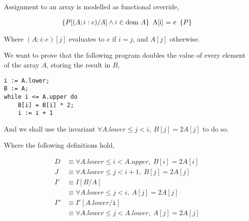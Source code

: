 \begin{definition}
  Assignment to an array is modelled as functional override,

  \begin{align*}
    \htriple{P[(A; i : e)/A] \land i \in \dom~A}{A[i] = e}{P}
  \end{align*}

  Where $(A; i : e)[j]$ evaluates to $e$ if $i = j$, and $A[j]$
  otherwise.
\end{definition}

\begin{example}
  \label{exmpl:heap-double}

  We want to prove that the following program doubles the value of
  every element of the array $A$, storing the result in $B$,

\begin{verbatim}
i := A.lower;
B := A;
while i <= A.upper do
    B[i] = B[i] * 2;
    i := i + 1
\end{verbatim}

  And we shall use the invariant $\forall A.lower \leq j < i,\ B[j]
  = 2 A[j]$ to do so.

  \begin{prooftree}




  \end{prooftree}

  Where the following definitions hold,

  \begin{align*}
    D &\equiv \forall A.lower \leq i < A.upper,\ B[i] = 2 A[i]\\
    J &\equiv \forall A.lower \leq j < i + 1,\ B[j] = 2 A[j]\\
    I' &\equiv I[B/A]\\
    &\equiv \forall A.lower \leq j < i,\ A[j] = 2 A[j]\\
    I'' &\equiv I'[A.lower/\mathtt{i}]\\
    &\equiv \forall A.lower \leq j < A.lower,\ A[j] = 2 A[j]
  \end{align*}
\end{example}

